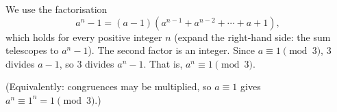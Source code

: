 We use the factorisation
\[
a^n-1=(a-1)\left(a^{n-1}+a^{n-2}+\cdots+a+1\right),
\]
which holds for every positive integer $n$ (expand the right-hand side: the sum telescopes to $a^n-1$). The second factor is an integer. Since $a\equiv1\pmod3$, $3$ divides $a-1$, so $3$ divides $a^n-1$. That is, $a^n\equiv1\pmod3$.

(Equivalently: congruences may be multiplied, so $a\equiv1$ gives $a^n\equiv1^n=1\pmod3$.)
